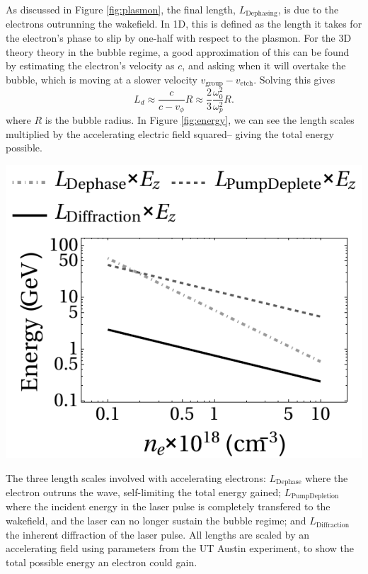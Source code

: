 \documentclass[12pt,letter]{article}
\begin{document}
As discussed in Figure \ref{fig:plasmon}, the final length, $L_\mathrm{Dephasing}$, is
    due to the electrons outrunning the wakefield. In 1D, this is defined
    as the length it takes for the electron's phase to slip by one-half
    with respect to the plasmon\cite{RevModPhys.81.1229}. For the 3D theory theory in the bubble regime, a good approximation of this
can be found by estimating the electron's velocity as $c$, and asking
when it will overtake the bubble, which is moving at a slower velocity
$v_\textrm{group}-v_\textrm{etch}$. Solving this gives
\begin{equation}
    L_d \approx \frac{c}{c-v_\phi}R \approx
    \frac{2}{3}\frac{\omega_0^2}{\omega_p^2}
    R.
\end{equation}
where $R$ is the bubble radius.
        In Figure \ref{fig:energy}, we can see the length scales multiplied by the
    accelerating electric field squared-- giving the total energy possible.     
    \begin{marginfigure}
            \includegraphics[width=\linewidth]{../figures/energy.pdf}
        \caption{The three length scales involved with accelerating electrons:
        $L_\mathrm{Dephase}$ where the electron outruns the wave, self-limiting
    the total energy gained; $L_\mathrm{Pump Depletion}$ where the incident
energy in the laser pulse is completely transfered to the wakefield, and the
laser can no longer sustain the bubble regime; and $L_\mathrm{Diffraction}$ the
inherent diffraction of the laser pulse. All lengths are scaled by an
accelerating field using parameters from the UT
Austin experiment\cite{Wang2013}, to show the total possible energy an electron
could gain.\label{fig:energy}}
    \end{marginfigure}
\end{document}
